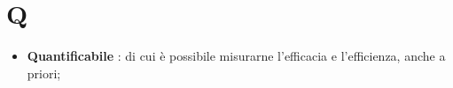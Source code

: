 % 
%
% 
%

\section{Q}

\begin{itemize}
	\item \textbf{Quantificabile} : di cui è possibile misurarne l'efficacia e l'efficienza, anche a priori;


\end{itemize}
